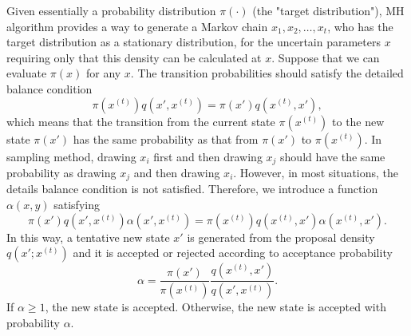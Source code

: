 Given essentially a probability distribution $\pi(\cdot)$ (the "target distribution"), MH algorithm provides a way to generate a Markov chain $x_1, x_2,\ldots, x_t$, who has the target distribution as a stationary distribution, for the uncertain parameters $x$ requiring only that this density can be calculated at $x$. Suppose that we can evaluate $\pi(x)$ for any $x$. The transition probabilities should satisfy the detailed balance condition
\begin{equation*}
\pi\left(x^{(t)}\right)q\left(x', x^{(t)}\right) = \pi\left(x'\right)q\left(x^{(t)}, x'\right),
\end{equation*}
which means that the transition from the current state $\pi(x^{(t)})$ to the new state $\pi(x')$ has the same probability as that from $\pi(x')$ to $\pi(x^{(t)})$. In sampling method, drawing $x_i$ first and then drawing $x_j$ should have the same probability as drawing $x_j$ and then drawing $x_i$. However, in most situations, the details balance condition is not satisfied. Therefore, we introduce a function $\alpha(x,y)$ satisfying 
\begin{equation*}
\pi\left(x'\right)q\left(x', x^{\left(t\right)}\right)\alpha\left(x',x^{\left(t\right)}\right) = \pi\left(x^{\left(t\right)}\right)q\left(x^{\left(t\right)}, x'\right)\alpha\left(x^{\left(t\right)},x'\right).
\end{equation*}
In this way, a tentative new state $x'$ is generated from the proposal density $q\left(x';x^{\left(t\right)}\right)$ and it is accepted or rejected according to acceptance probability 
\begin{equation}\label{alphabalance}
\alpha=\frac{\pi\left(x'\right)}{\pi\left(x^{\left(t\right)}\right)}\frac{q\left(x^{\left(t\right)}, x'\right)}{q\left(x', x^{\left(t\right)}\right)}.
\end{equation}
If $\alpha \geq 1$, the new state is accepted. Otherwise, the new state is accepted with probability $\alpha$.

